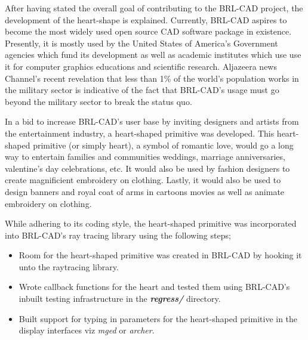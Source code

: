 \hspace{30} After   having   stated   the overall   goal   of   contributing   to   the   BRL-­CAD   
project, the development of the heart-shape is explained. Currently,  
BRL­-CAD   aspires   to   become   the   most   widely   used   open   source  
CAD   software   package   in   existence.   Presently,   it   is   mostly  
used   by   the   United   States   of   America's   Government   agencies   which   fund   its  
development   as   well   as   academic   institutes   which   use   use   it   for   computer  
graphics   educations   and   scientific   research.   Aljazeera   news   Channel's   recent  
revelation   that   less   than   1\%   of   the   world's   population   works   in   the   military   sector  
is   indicative   of   the   fact   that   BRL-­CAD's   usage   must   go   beyond   the   military  
sector to break the status­ quo.   

\hspace{30} In   a   bid   to   increase   BRL-­CAD's   user   base   by   inviting   designers   and  
artists   from   the   entertainment   industry, a heart-­shaped primitive was developed.
 This   heart­-shaped   primitive   (or   simply   heart),   a   symbol of   romantic   love, 
  would   go   a   long   way   to   entertain   families   and   communities  
weddings,   marriage   anniversaries,   valentine's   day   celebrations,   etc.   It   would  
also   be   used   by   fashion   designers   to   create   magnificient   embroidery   on  
clothing.   Lastly,   it   would   also   be   used   to   design   banners   and   royal   coat   of   arms  
in cartoons movies as well as animate embroidery on clothing.   

\hspace{30} While   adhering   to   its   coding   style,  the heart-­shaped  
primitive was incorporated into BRL­-CAD's ray tracing library using the following steps;  

\begin{itemize}
\item Room for the heart-shaped primitive was created in BRL­-CAD by hooking it unto the raytracing library.  
\item Wrote callback   functions   for   the   heart   and   tested   them   using   BRL-­CAD's  
inbuilt testing infrastructure in the \textit{\textbf{regress/}} directory.  
\item Built   support   for   typing   in   parameters   for   the   heart­-shaped   primitive   in   the  
display interfaces viz \textit{mged} or \textit{archer}.
\end{itemize}

